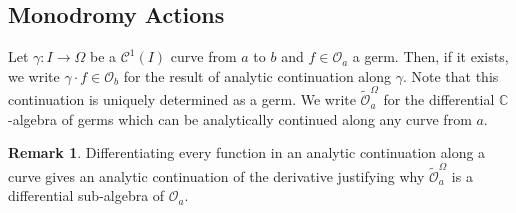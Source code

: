 \documentclass[12pt]{extarticle}
\newcommand{\C}{\mathbb{C}}
\theoremstyle{definition}
\newtheorem{remark}{Remark}
\newenvironment{definition}[1][Definition:]{\begin{trivlist}
\item[\hskip \labelsep {\bfseries #1}]}{\end{trivlist}}
\newcommand{\Class}[2]{\mathcal{C}^{#1} \left( #2 \right)}
\renewcommand{\O}{\mathcal{O}}
\begin{document}
\subsection{Monodromy Actions}

\begin{definition}
Let $\gamma : I \to \Omega$ be a $\Class{1}{I}$ curve from $a$ to $b$ and $f \in \O_a$ a germ. Then, if it exists, we write $\gamma \cdot f \in \O_b$ for the result of analytic continuation along $\gamma$. Note that this continuation is uniquely determined as a germ. We write $\tilde{\O}_a^\Omega$ for the differential $\C$-algebra of germs which can be analytically continued along any curve from $a$. 
\end{definition}

\begin{remark}
Differentiating every function in an analytic continuation along a curve gives an analytic continuation of the derivative justifying why $\tilde{\O}_a^\Omega$ is a differential sub-algebra of $\O_a$.
\end{remark}
\end{document}
